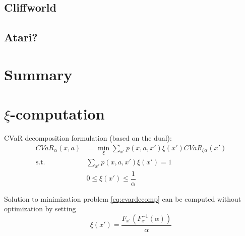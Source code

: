 \subsection{Cliffworld}

\subsection{Atari?}

\section{Summary}





\section{$\xi$-computation}


CVaR decomposition formulation (based on the dual):
\begin{equation}\label{eq:cvardecomp}
\begin{split}
CVaR_\alpha(x, a)&=\min_{\xi} \sum_{x'} p(x, a, x')\xi(x') CVaR_{\xi\alpha}(x')\\
\text{s.t.}\quad &\sum_{x'}p(x, a, x')\xi(x')=1\\
&0 \le \xi(x')\le \dfrac{1}{\alpha}
\end{split}
\end{equation}

\begin{theorem}
Solution to minimization problem \ref{eq:cvardecomp} can be computed without optimization by setting
\begin{equation}\label{eq:xi-claim}
\xi(x') = \dfrac{F_{x'}(F^{-1}_x(\alpha))}{\alpha}
\end{equation}
\end{theorem}

